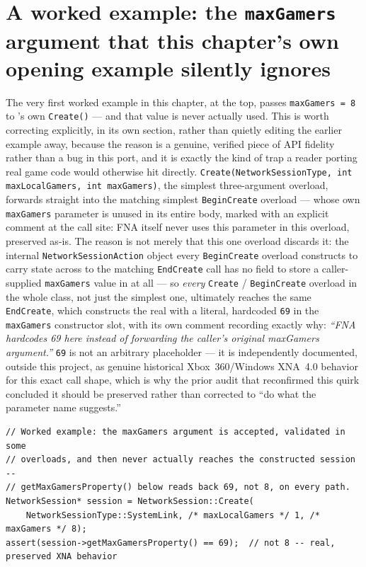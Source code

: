 \section{A worked example: the \texttt{maxGamers} argument that this chapter's own opening example silently ignores}

The very first worked example in this chapter, at the top, passes \texttt{maxGamers = 8} to
's own \texttt{Create()} --- and that value is never actually used.
This is worth correcting explicitly, in its own section, rather than quietly editing the
earlier example away, because the reason is a genuine, verified piece of API fidelity rather
than a bug in this port, and it is exactly the kind of trap a reader porting real game code
would otherwise hit directly. \texttt{Create(NetworkSessionType, int maxLocalGamers, int
maxGamers)}, the simplest three-argument overload, forwards straight into the matching simplest
\texttt{BeginCreate}
overload --- whose own \texttt{maxGamers} parameter is unused in its entire body, marked with an
explicit comment at the call site: FNA itself never uses this parameter in this overload,
preserved as-is. The reason is not merely that this one overload discards it: the internal
\texttt{NetworkSessionAction} object every \texttt{BeginCreate} overload constructs to carry
state across to the matching \texttt{EndCreate} call has no field to store a caller-supplied
\texttt{maxGamers} value in at all --- so \emph{every} \texttt{Create} / \texttt{BeginCreate}
overload in the whole class, not just the simplest one, ultimately reaches the same
\texttt{EndCreate}, which constructs the real  with a literal, hardcoded
\texttt{69} in the \texttt{maxGamers} constructor slot, with its own comment recording exactly
why: \emph{``FNA hardcodes 69 here instead of forwarding the caller's original maxGamers
argument.''} \texttt{69} is not an arbitrary placeholder --- it is independently documented,
outside this project, as genuine historical Xbox~360/Windows XNA~4.0 behavior for this exact
call shape, which is why the prior audit that reconfirmed this quirk concluded it should be
preserved rather than corrected to ``do what the parameter name suggests.''

\begin{lstlisting}
// Worked example: the maxGamers argument is accepted, validated in some
// overloads, and then never actually reaches the constructed session --
// getMaxGamersProperty() below reads back 69, not 8, on every path.
NetworkSession* session = NetworkSession::Create(
    NetworkSessionType::SystemLink, /* maxLocalGamers */ 1, /* maxGamers */ 8);
assert(session->getMaxGamersProperty() == 69);  // not 8 -- real, preserved XNA behavior
\end{lstlisting}

